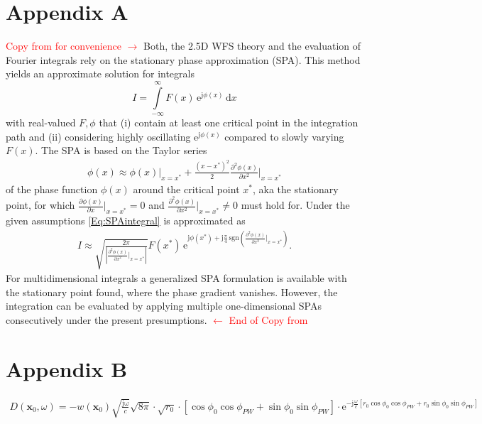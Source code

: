 \documentclass[a4paper,BCOR=15mm,10pt,twoside]{scrartcl}
\newcommand{\fscom}[2][red]{\textcolor{#1}{#2}}  %
\newcommand\e{\mathrm{e}}  %
\newcommand\im{\mathrm{j}}  %
\newcommand\fsd{\mathrm{d}}  %
\begin{document}
\section{Appendix A}
\fscom{Copy from \cite{Firtha2018} for convenience $\rightarrow$}
%
Both, the 2.5D WFS theory and the evaluation of Fourier integrals rely on the stationary phase approximation (SPA).
This method yields an approximate solution for integrals
\begin{equation}
\label{Eq:SPAintegral}
I = \int\limits_{-\infty}^{\infty} F(x) \, \e^{\im \phi(x)} \, \fsd x
\end{equation}
with real-valued $F,\phi$ that (i) contain at least one critical point in the integration path and (ii) considering highly oscillating $\e^{\im \phi(x)}$ compared to slowly varying $F(x)$. %
The SPA is based on the Taylor series
\begin{align}
\phi(x) \approx \phi(x)\big|_{x=x^*} + \frac{(x-x^*)^2}{2} \frac{\partial^2 \phi(x)}{\partial x^2}\bigg|_{x=x^*} 
\end{align} 
of the phase function $\phi(x)$ around the critical point $x^*$, aka the stationary point, for which $\frac{\partial \phi(x)}{\partial x}\big|_{x=x^*} = 0$ and $\frac{\partial^2 \phi(x)}{\partial x^2}\big|_{x=x^*} \neq 0$ must hold for.
Under the given assumptions \eqref{Eq:SPAintegral} is approximated as %
\begin{align}
\label{Eq:SPAResult}
I \approx \sqrt{\frac{2\pi}{| \frac{\partial^2 \phi(x)}{\partial x^2}\big|_{x=x^*}  |}} F(x^*) \, \e^{\im \phi(x^*) + \im \frac{\pi}{4}\,\mathrm{sgn}\left(  \frac{\partial^2 \phi(x)}{\partial x^2}\big|_{x=x^*}  \right)}.
\end{align}
For multidimensional integrals a generalized SPA formulation is available with the stationary point found, where the phase gradient vanishes. %
However, the integration can be evaluated by applying multiple one-dimensional SPAs consecutively under the present presumptions.
\fscom{$\leftarrow$ End of Copy from \cite{Firtha2018}}



\section{Appendix B}

\begin{align}
D(\mathbf{x}_0,\omega) = -w(\mathbf{x}_0) \sqrt{\frac{\mathrm{j \omega}}{c}} \sqrt{8 \pi} \cdot
\sqrt{r_0} \cdot
[\cos\phi_0 \cos\phi_{PW} + \sin\phi_0 \sin\phi_{PW}]
\cdot
\mathrm{e}^{- \mathrm{j} \frac{\omega}{c}
[
r_0 \cos\phi_0 \cos\phi_{PW} + r_0 \sin\phi_0 \sin\phi_{PW}
]}
\end{align}
\end{document}
